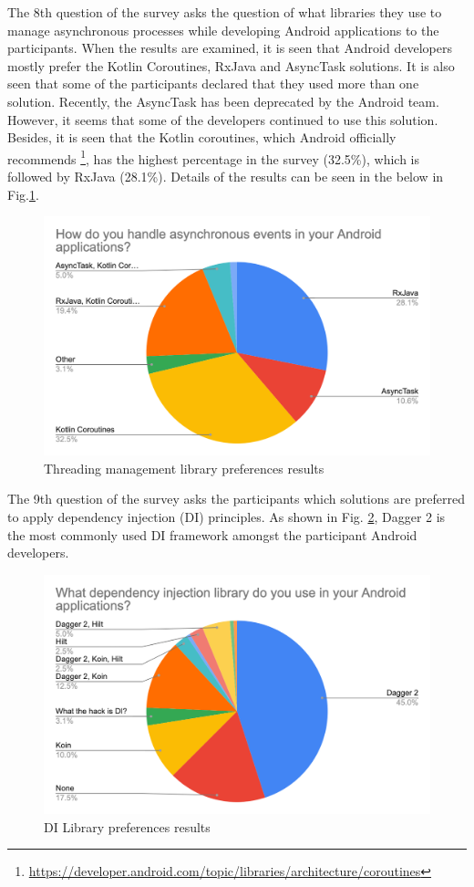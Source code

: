 The 8th question of the survey asks the question of what libraries they use to manage asynchronous processes while developing Android applications to the participants. When the results are examined, it is seen that Android developers mostly prefer the Kotlin Coroutines, RxJava and AsyncTask solutions. It is also seen that some of the participants declared that they used more than one solution. Recently, the AsyncTask has been deprecated by the Android team. However, it seems that some of the developers continued to use this solution. Besides, it is seen that the Kotlin coroutines, which Android officially recommends \footnote{\url{https://developer.android.com/topic/libraries/architecture/coroutines}}, has the highest percentage in the survey (32.5\%), which is followed by RxJava (28.1\%). Details of the results can be seen in the below in Fig.\ref{fig:async_events}.
\begin{figure}[ht!]
    \centering
    \includegraphics[scale=0.25]{figures/survey_q8_async_events.png}
    \caption{Threading management library preferences results}
    \label{fig:async_events}
\end{figure}
\FloatBarrier

The 9th question of the survey asks the participants which solutions are preferred to apply dependency injection (DI) principles. As shown in Fig. \ref{fig:di_lib}, Dagger 2 is the most commonly used DI framework amongst the participant Android developers. 
\begin{figure}[ht!]
    \centering
    \includegraphics[scale=0.27]{figures/survey_q9_di_lib.png}
    \caption{DI Library preferences results}
    \label{fig:di_lib}
\end{figure}
\FloatBarrier

